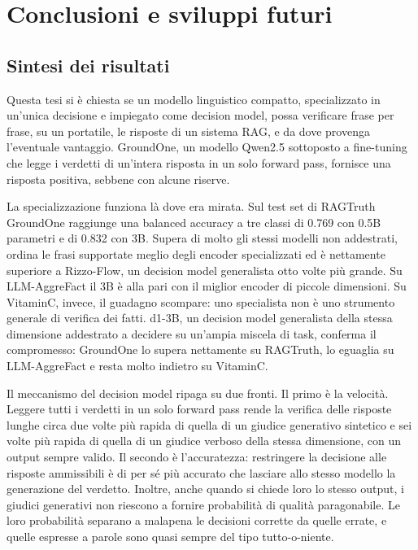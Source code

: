 \chapter{Conclusioni e sviluppi futuri}
\label{sec:conclusion}

\section{Sintesi dei risultati}
\label{sec:concl-summary}

Questa tesi si è chiesta se un modello linguistico compatto, specializzato in un'unica decisione e impiegato come
decision model, possa verificare frase per frase, su un portatile, le risposte di un sistema RAG, e da dove provenga
l'eventuale vantaggio. GroundOne, un modello Qwen2.5 sottoposto a fine-tuning che legge i verdetti di un'intera risposta
in un solo forward pass, fornisce una risposta positiva, sebbene con alcune riserve.

La specializzazione funziona là dove era mirata. Sul test set di RAGTruth GroundOne raggiunge una balanced accuracy a tre
classi di 0.769 con 0.5B parametri e di 0.832 con 3B. Supera di molto gli stessi modelli non addestrati, ordina le frasi
supportate meglio degli encoder specializzati ed è nettamente superiore a Rizzo-Flow, un decision model generalista otto
volte più grande. Su LLM-AggreFact il 3B è alla pari con il miglior encoder di piccole dimensioni. Su VitaminC, invece,
il guadagno scompare: uno specialista non è uno strumento generale di verifica dei fatti. d1-3B, un decision model
generalista della stessa dimensione addestrato a decidere su un'ampia miscela di task, conferma il compromesso: GroundOne
lo supera nettamente su RAGTruth, lo eguaglia su LLM-AggreFact e resta molto indietro su VitaminC.

Il meccanismo del decision model ripaga su due fronti. Il primo è la velocità. Leggere tutti i verdetti in un solo forward pass
rende la verifica delle risposte lunghe circa due volte più rapida di quella di un giudice generativo sintetico e sei
volte più rapida di quella di un giudice verboso della stessa dimensione, con un output sempre valido. Il secondo è
l'accuratezza: restringere la decisione alle risposte ammissibili è di per sé più accurato che lasciare allo stesso
modello la generazione del verdetto. Inoltre, anche quando si chiede loro lo stesso output, i giudici generativi non
riescono a fornire probabilità di qualità paragonabile. Le loro probabilità separano a malapena le decisioni corrette da
quelle errate, e quelle espresse a parole sono quasi sempre del tipo tutto-o-niente.

